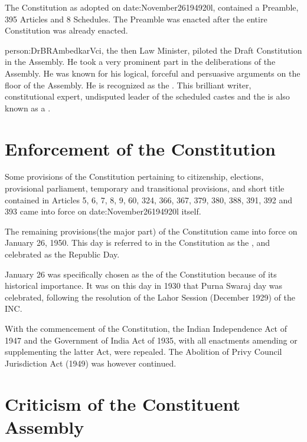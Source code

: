 { The Constitution as adopted on \gls{date:November26194920l}, contained a Preamble, 395 Articles and 8 Schedules}. The Preamble was enacted after the entire Constitution was already enacted.

\gls{person:DrBRAmbedkarVci}, the then Law Minister, piloted the Draft Constitution in the Assembly. He took a very prominent part in the deliberations of the Assembly. He was known for his logical, forceful and persuasive arguments on the floor of the Assembly. He is recognized as the . This brilliant writer, constitutional expert, undisputed leader of the scheduled castes and the  is also known as a .

\section{Enforcement of the Constitution}

Some provisions of the Constitution pertaining to citizenship, elections, provisional parliament, temporary and transitional provisions, and short title contained in Articles 5, 6, 7, 8, 9, 60, 324, 366, 367, 379, 380, 388, 391, 392 and 393 came into force on \gls{date:November26194920l} itself.

The remaining provisions(the major part) of the Constitution came into force on January 26, 1950. This day is referred to in the Constitution as the , and celebrated as the Republic Day.

January 26 was specifically chosen as the  of the Constitution because of its historical importance. It was on this day in 1930 that { Purna Swaraj} day was celebrated, following the resolution of the Lahor Session (December 1929) of the INC.

With the commencement of the Constitution, the Indian Independence Act of 1947 and the Government of India Act of 1935, with all enactments amending or supplementing the latter Act, were repealed. The Abolition of Privy Council Jurisdiction Act (1949) was however continued.

\section{Criticism of the Constituent Assembly}

